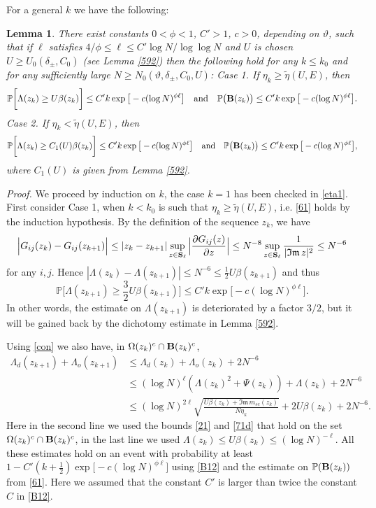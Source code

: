 \documentclass[draft]{article}
\newcommand{\ttau}{\vartheta}
\newcommand{\wt}{\widetilde}
\newcommand{\non}{\nonumber}
\newcommand{\be}{\begin{equation}}
\newcommand{\ee}{\end{equation}}
\newcommand{\im}{{\mathfrak{Im} \, }}
\renewcommand{\P}{{\mathbb P}}
\newcommand{\bS}{ {\bf  S}}
\newtheorem{lemma}[theorem]{Lemma}
\numberwithin{equation}{section}
\numberwithin{theorem}{section}
\numberwithin{definition}{section}
\numberwithin{remark}{section}
\begin{document}
For a general $k$ we have the following:



\begin{lemma}\label{lm:ind} 
There exist constants $0< \phi < 1$, $C'>1$, $c>0$, depending on $\ttau$,
such that if $\ell$ satisfies $4/\phi\le \ell \le C'\log N/\log\log N$
and $U$ is chosen $U\ge  U_0(\delta_\pm, C_0)$ (see  Lemma \ref{592})
 then  the following hold for any $k\le k_0$
and for any sufficiently large  $N\ge N_0(\ttau,\delta_\pm, C_0, U)$: 
\medskip
\noindent
{\it Case 1.} 
If $\eta_k \ge \wt\eta(U,E)$, then
\be\label{61}
\P \bigg [ 
  \Lambda (z_k)  \ge U\beta(z_k)    \bigg ] \le  C'k\exp{\big[-c(\log N)^{\phi \ell} \big]}
\quad \mbox{and}\quad
 \P\big( {\bf B}(z_k)\big) \le  C'k\exp{\big[-c(\log N)^{\phi \ell} \big]}.
\ee  
{\it Case 2.} If  $\eta_k < \wt\eta(U,E)$, then
\be\label{61uj}
\P \bigg [ 
  \Lambda (z_k)  \ge C_1(U)\beta(z_k)    
   \bigg ]\le C'k\exp{\big[-c(\log N)^{\phi \ell} \big]}
 \quad \mbox{and}\quad  \P\big( {\bf B}(z_k)\big) \le C'k\exp{\big[-c(\log N)^{\phi \ell} \big]},
\ee   
where $C_1(U)$ is given from Lemma \ref{592}.
\end{lemma}


{\it Proof.} We proceed by induction on $k$, the case $k=1$ has been checked in \eqref{eta1}.
First consider Case 1, when $k<k_0$ is such that $\eta_k \ge \wt\eta(U,E)$, i.e.
\eqref{61} holds by the induction hypothesis.
By the definition of the sequence $z_k$, we  have 
\be\label{con}
\Big |  G_{ij}(z_k)  -   G_{ij} (z_{k+1}) \Big |
\le |z_k-z_{k+1}|  \sup_{z\in \bS_\ell}
\Big | \frac{\partial G_{ij} (z) }{\partial z} \Big | \le N^{-8} \sup_{z\in \bS_\ell}
\frac{1}{|\im z|^2} \le  N^{-6}
\ee
for any $i,j$.  Hence $|\Lambda(z_k)-\Lambda(z_{k+1})|\le N^{-6} \le \frac{1}{2}U\beta(z_{k+1}) $
 and thus
\be\label{611}
\P \bigg [     \Lambda (z_{k+1}) \ge \frac{3}{ 2} U \beta(z_{k+1})  \bigg ] 
\le C'k\exp{\big[-c(\log N)^{\phi \ell} \big]}.
\ee  
In other words, the estimate on $ \Lambda (z_{k+1}) $ is deteriorated by a factor $3/2$,
but it will be gained back by the dichotomy estimate in Lemma \ref{592}.

Using \eqref{con} we also have, in $\Omega(z_k)^c\cap {\bf B}(z_k)^c$,
\begin{align}\label{68}
 \Lambda_d (z_{k+1}) + \Lambda_o (z_{k+1})  & \le \Lambda_d (z_{k}) + 
\Lambda_o (z_{k})  + 2N^{-6}  \non \\
 &  \le 
(\log N)^\ell   (\Lambda(z_k)^2+\Psi (z_k)) + \Lambda(z_k) + 2N^{-6}   \non \\
& \le (\log N)^{2 \ell} \sqrt{\frac{U\beta(z_k)
 +\im m_{sc}(z_k) }{N\eta_k}} + 2U\beta(z_k) + 2N^{-6} . 
\end{align}
Here in the second line
we used the bounds \eqref{21} and \eqref{71d} that hold on
the set $\Omega(z_k)^c\cap {\bf B}(z_k)^c$, in the last line
we used $\Lambda(z_k)\le U\beta(z_k)\le (\log N)^{-\ell}$. All these
estimates hold on an event with probability at least 
$1-C'(k+\frac{1}{2})\exp{\big[-c(\log N)^{\phi \ell} \big]}$ using \eqref{B12} and 
the estimate on $\P({\bf B}(z_k))$ from \eqref{61}.
Here we assumed that the constant $C'$ is larger than twice
the constant $C$ in \eqref{B12}.
\end{document}
